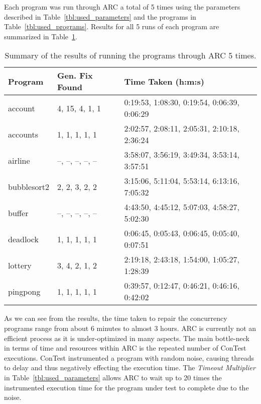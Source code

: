 Each program was run through ARC a total of 5 times using the parameters
described in Table~\ref{tbl:used_parameters} and the programs in
Table~\ref{tbl:used_programs}. Results for all 5 runs of each program are summarized in
Table~\ref{tbl:summary_results}.

\begin{table}[t!]
\caption{Summary of the results of running the programs through ARC 5 times.}
\begin{center}
\lstset{basicstyle=\scriptsize}
\begin{tabular}{|l|l|l|}
\hline
\textbf{Program} & \textbf{Gen. Fix Found} & \textbf{Time Taken (h:m:s)}\\
\hline
account & 4, 15, 4, 1, 1 & 0:19:53, 1:08:30, 0:19:54, 0:06:39, 0:06:29\\
\hline
accounts & 1, 1, 1, 1, 1 & 2:02:57, 2:08:11, 2:05:31, 2:10:18, 2:36:24\\
\hline
airline & --, --, --, --, -- & 3:58:07, 3:56:19, 3:49:34, 3:53:14, 3:57:51\\
\hline
bubblesort2 & 2, 2, 3, 2, 2 & 3:15:06, 5:11:04, 5:53:14, 6:13:16, 7:05:32 \\
\hline
buffer & --, --, --, --, -- & 4:43:50, 4:45:12, 5:07:03, 4:58:27, 5:02:30\\
\hline
deadlock & 1, 1, 1, 1, 1 & 0:06:45, 0:05:43, 0:06:45, 0:05:40, 0:07:51\\
\hline
lottery & 3, 4, 2, 1, 2 & 2:19:18, 2:43:18, 1:54:00, 1:05:27, 1:28:39\\
\hline
pingpong & 1, 1, 1, 1, 1 & 0:39:57, 0:12:47, 0:46:21, 0:46:16, 0:42:02\\
\hline
\end{tabular}
\label{tbl:summary_results}
\end{center}
\end{table}

As we can see from the results, the time taken to repair the concurrency programs range from about 6
minutes to almost 3 hours. ARC is currently not an efficient process as it is
under-optimized in many aspects. The main bottle-neck in terms of time and
resources within ARC is the repeated number of ConTest executions. ConTest
instrumented a program with random noise, causing threads to delay and thus negatively effecting the
execution time.  The \textit{Timeout Multiplier} in
Table~\ref{tbl:used_parameters} allows ARC to wait up to 20 times the instrumented
execution time for the program under test to complete due to the noise.

